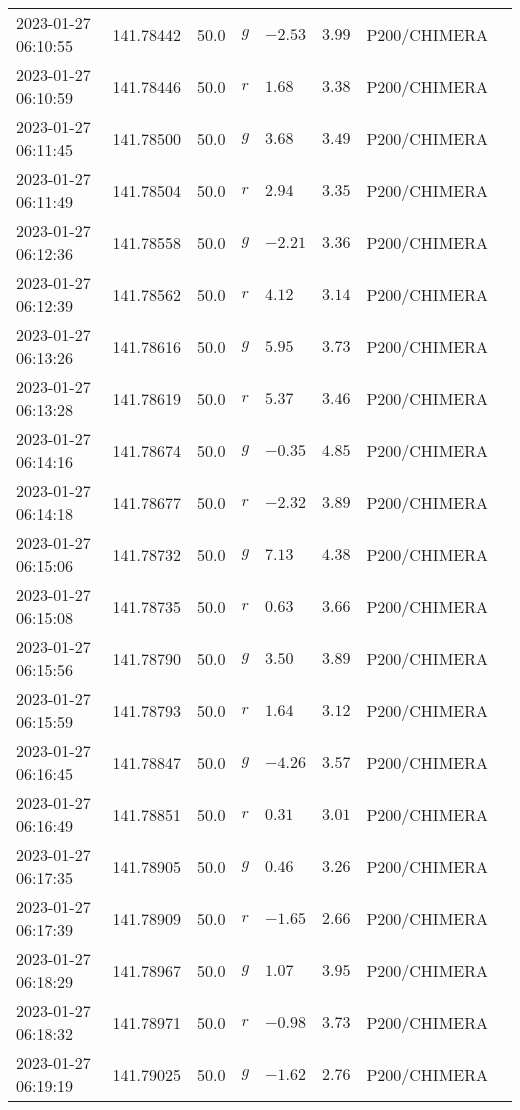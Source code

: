 \documentclass{nature_plusfigure}
\begin{document}
\begin{supplement}
\begin{center}
\begin{longtable}{llllllll}
2023-01-27 06:10:55 & 141.78442 & 50.0 & $g$ & $-2.53$ & $3.99$ & P200/CHIMERA &  \\ 
2023-01-27 06:10:59 & 141.78446 & 50.0 & $r$ & $1.68$ & $3.38$ & P200/CHIMERA &  \\ 
2023-01-27 06:11:45 & 141.78500 & 50.0 & $g$ & $3.68$ & $3.49$ & P200/CHIMERA &  \\ 
2023-01-27 06:11:49 & 141.78504 & 50.0 & $r$ & $2.94$ & $3.35$ & P200/CHIMERA &  \\ 
2023-01-27 06:12:36 & 141.78558 & 50.0 & $g$ & $-2.21$ & $3.36$ & P200/CHIMERA &  \\ 
2023-01-27 06:12:39 & 141.78562 & 50.0 & $r$ & $4.12$ & $3.14$ & P200/CHIMERA &  \\ 
2023-01-27 06:13:26 & 141.78616 & 50.0 & $g$ & $5.95$ & $3.73$ & P200/CHIMERA &  \\ 
2023-01-27 06:13:28 & 141.78619 & 50.0 & $r$ & $5.37$ & $3.46$ & P200/CHIMERA &  \\ 
2023-01-27 06:14:16 & 141.78674 & 50.0 & $g$ & $-0.35$ & $4.85$ & P200/CHIMERA &  \\ 
2023-01-27 06:14:18 & 141.78677 & 50.0 & $r$ & $-2.32$ & $3.89$ & P200/CHIMERA &  \\ 
2023-01-27 06:15:06 & 141.78732 & 50.0 & $g$ & $7.13$ & $4.38$ & P200/CHIMERA &  \\ 
2023-01-27 06:15:08 & 141.78735 & 50.0 & $r$ & $0.63$ & $3.66$ & P200/CHIMERA &  \\ 
2023-01-27 06:15:56 & 141.78790 & 50.0 & $g$ & $3.50$ & $3.89$ & P200/CHIMERA &  \\ 
2023-01-27 06:15:59 & 141.78793 & 50.0 & $r$ & $1.64$ & $3.12$ & P200/CHIMERA &  \\ 
2023-01-27 06:16:45 & 141.78847 & 50.0 & $g$ & $-4.26$ & $3.57$ & P200/CHIMERA &  \\ 
2023-01-27 06:16:49 & 141.78851 & 50.0 & $r$ & $0.31$ & $3.01$ & P200/CHIMERA &  \\ 
2023-01-27 06:17:35 & 141.78905 & 50.0 & $g$ & $0.46$ & $3.26$ & P200/CHIMERA &  \\ 
2023-01-27 06:17:39 & 141.78909 & 50.0 & $r$ & $-1.65$ & $2.66$ & P200/CHIMERA &  \\ 
2023-01-27 06:18:29 & 141.78967 & 50.0 & $g$ & $1.07$ & $3.95$ & P200/CHIMERA &  \\ 
2023-01-27 06:18:32 & 141.78971 & 50.0 & $r$ & $-0.98$ & $3.73$ & P200/CHIMERA &  \\ 
2023-01-27 06:19:19 & 141.79025 & 50.0 & $g$ & $-1.62$ & $2.76$ & P200/CHIMERA &  \\ 

\end{longtable}
\end{center}
\end{supplement}
\end{document}
